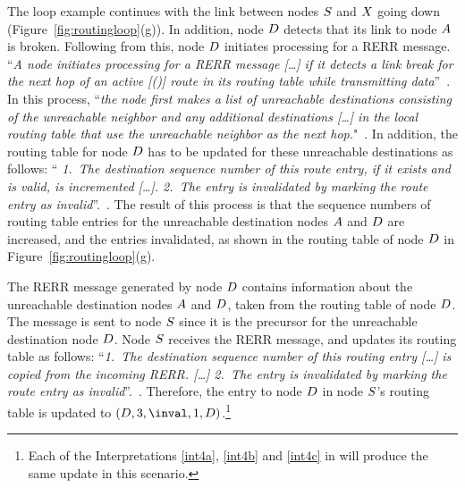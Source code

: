 \documentclass[letterpaper]{sig-alternate-pages}
\newcommand{\gennode}[1]{\ensuremath{\MakeUppercase{#1}}\xspace}
\newcommand{\na}{\gennode{a}}
\newcommand{\nd}{\gennode{d}}
\newcommand{\ns}{\gennode{s}}
\newcommand{\nx}{\gennode{x}}
\newcommand{\rtes}{routing table entries\xspace}
\renewcommand{\sf}{\it}
\begin{document}
The loop example continues with the link between nodes \ns and \nx going down (Figure~\ref{fig:routingloop}(g)). In addition, node \nd detects that its link to node \na is broken. Following from this, node \nd initiates processing for a RERR message. 
``{\sf A node initiates processing for a RERR message {[\dots]} if it detects a link break for the next hop of an active [(\val)] 
route in its routing table while transmitting data\/}''~\cite[Sect. 6.11]{rfc3561}.
In this process, ``{\sf the node first makes a list of unreachable destinations consisting of the unreachable neighbor and any additional destinations {[\dots]} in the local routing table that use the unreachable neighbor as the next hop.}"~\cite[Sect. 6.11]{rfc3561}. In addition, the routing table for node \nd has to be updated for these unreachable destinations as follows:
``{\sf 
1.~The destination sequence number of this route entry, if it exists and is valid, is incremented {[\dots]}. 
2.~The entry is invalidated by marking the route entry as invalid\/}''.~\cite[Sect. 6.11]{rfc3561}. 
The result of this process is that the sequence numbers of \rtes for the unreachable destination nodes \na and \nd are increased, and the entries invalidated, as shown in the routing table of node \nd in Figure~\ref{fig:routingloop}(g).

The RERR message generated by node \nd contains information about the unreachable destination nodes \na and \nd, taken from the routing table of node \nd. The message is sent to node \ns since it is the precursor for the unreachable destination node \nd.
Node \ns receives the RERR message, and updates its routing table as follows:
``{\sf 1.~The destination sequence number of this routing entry {[\dots]} is copied from the incoming RERR. {[\dots]} 2.~The entry is invalidated by marking the route entry as invalid\/}''.~\cite[Sect. 6.11]{rfc3561}.
Therefore, the entry to node \nd in node \ns's routing table is updated to $(D,3,\inval,1,D)$.\footnote{Each of the Interpretations \ref{int4a}, \ref{int4b} and \ref{int4c} in  will produce the same update in this scenario.}
\end{document}
